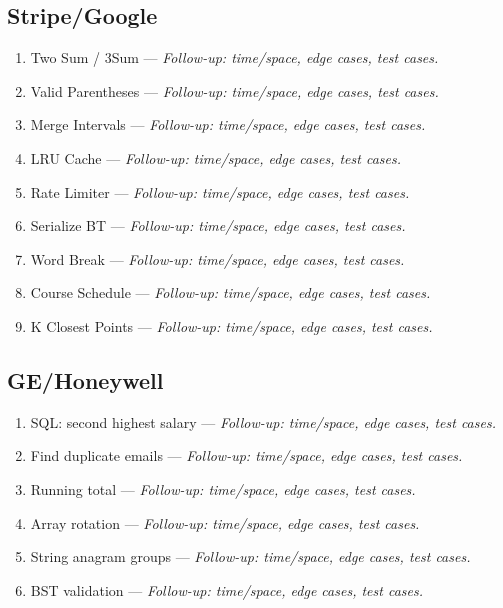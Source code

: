 \documentclass[9pt,a4paper]{article}
\begin{document}
\subsection{Stripe/Google}
\begin{enumerate}
  \item Two Sum / 3Sum --- \textit{Follow-up: time/space, edge cases, test cases.}
  \item Valid Parentheses --- \textit{Follow-up: time/space, edge cases, test cases.}
  \item Merge Intervals --- \textit{Follow-up: time/space, edge cases, test cases.}
  \item LRU Cache --- \textit{Follow-up: time/space, edge cases, test cases.}
  \item Rate Limiter --- \textit{Follow-up: time/space, edge cases, test cases.}
  \item Serialize BT --- \textit{Follow-up: time/space, edge cases, test cases.}
  \item Word Break --- \textit{Follow-up: time/space, edge cases, test cases.}
  \item Course Schedule --- \textit{Follow-up: time/space, edge cases, test cases.}
  \item K Closest Points --- \textit{Follow-up: time/space, edge cases, test cases.}
\end{enumerate}
\subsection{GE/Honeywell}
\begin{enumerate}
  \item SQL: second highest salary --- \textit{Follow-up: time/space, edge cases, test cases.}
  \item Find duplicate emails --- \textit{Follow-up: time/space, edge cases, test cases.}
  \item Running total --- \textit{Follow-up: time/space, edge cases, test cases.}
  \item Array rotation --- \textit{Follow-up: time/space, edge cases, test cases.}
  \item String anagram groups --- \textit{Follow-up: time/space, edge cases, test cases.}
  \item BST validation --- \textit{Follow-up: time/space, edge cases, test cases.}
\end{enumerate}
\end{document}
